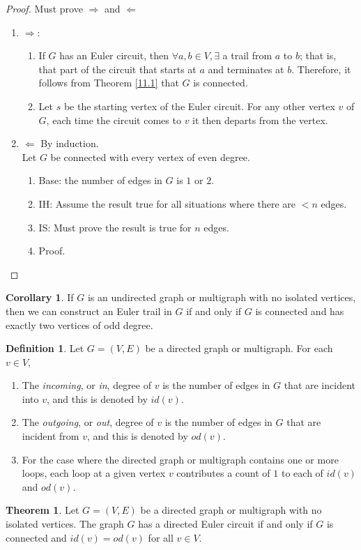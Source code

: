 \documentclass[letter]{book}
\theoremstyle{definition}
\newtheorem{theorem}{Theorem}[chapter]
\newtheorem{corollary}{Corollary}[chapter]
\theoremstyle{definition}
\newtheorem{mydef}{Definition}[chapter]
\theoremstyle{remark}
\begin{document}
\begin{proof} Must prove $\Rightarrow$ and $\Leftarrow$
    \begin{enumerate}
        \item $\Rightarrow$:
            \begin{enumerate}
                \item If $G$ has an Euler circuit, then $ \forall a,b\in V, \exists$ a trail from $a$ to $b$; that is, that part of the circuit that starts at $a$ and terminates at $b$. Therefore, it follows from Theorem \ref{11.1} that $G$ is connected.
                \item Let $s$ be the starting vertex of the Euler circuit. For any other vertex $v$ of $G$, each time the circuit comes to $v$ it then departs from the vertex.
            \end{enumerate}
        \item $\Leftarrow$ By induction.\\
            Let $G$ be connected with every vertex of even degree.
            \begin{enumerate}
                \item Base: the number of edges in $G$ is $1$ or $2$.
                \item IH: Assume the result true for all situations where there are $<n$ edges.
                \item IS: Must prove the result is true for $n$ edges.
                \item Proof.
            \end{enumerate}
    \end{enumerate}
\end{proof}
\bigskip
\begin{corollary}
    If $G$ is an undirected graph or multigraph with no isolated vertices, then we can construct an Euler trail in $G$ if and only if $G$ is connected and has exactly two vertices of odd degree.
\end{corollary}
\bigskip
\begin{mydef}
    Let $G=(V,E)$ be a directed graph or multigraph. For each $v\in V$,
    \begin{enumerate}[label=\alph*)]
        \item The \textit{incoming}, or \textit{in}, degree of $v$ is the number of edges in $G$ that are incident into $v$, and this is denoted by $id(v)$.
        \item The \textit{outgoing}, or \textit{out}, degree of $v$ is the number of edges in $G$ that are incident from $v$, and this is denoted by $od(v)$.
        \item For the case where the directed graph or multigraph contains one or more loops, each loop at a given vertex $v$ contributes a count of $1$ to each of $id(v)$ and $od(v)$.
    \end{enumerate}
\end{mydef}
\bigskip
\begin{theorem}
    Let $G=(V,E)$ be a directed graph or multigraph with no isolated vertices. The graph $G$ has a directed Euler circuit if and only if $G$ is connected and $id(v)=od(v)$ for all $v\in V$.
\end{theorem}
\end{document}
